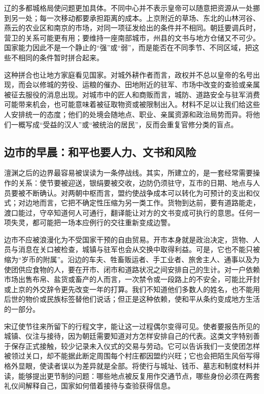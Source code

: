 辽的多都城格局使问题更加具体。不同中心并不表示皇帝可以随意把资源从一处挪到另一处；每一次移动都要承担距离的成本。上京附近的草场、东北的山林河谷、燕云的农业区和南京的市场，对同一项征发给出的条件并不相同。朝廷要调兵时，营卫的关系可能更有用；要维持一座南部城市，州县的文书与地方仓储又不可少。国家能力因此不是一个静止的“强”或“弱”，而是能否在不同季节、不同区域，把这些不相同的条件暂时拼合起来。

这种拼合也让地方家庭看见国家。对城外耕作者而言，政权并不总以皇帝的名号出现，而会以修城的劳役、运粮的催办、田地附近的驻军、市场中改变的查验或亲属被征去服役的消息出现。对城市中的匠人和商贩而言，城防、道路安全与驻军消费可能带来机会，也可能意味着被征取物资或被限制出入。材料不足以让我们给这些人安排统一的态度；他们的处境会随地点、职业、亲属资源和政治局势而异。将他们一概写成“受益的汉人”或“被统治的居民”，反而会重复官修分类的盲点。

\subsection{边市的早晨：和平也要人力、文书和风险}

澶渊之后的边界最容易被误读为一条停战线。其实，所建立的，是一套经常需要操作的关系：使节要被迎送，银绢要被交收，边防仍须驻守，互市的日期、地点与人员要被不断确认。对两朝中枢而言，盟约使战争成本可以转化为可预计的支出和仪式；对边地而言，它把不确定性压缩为另一类工作。货物到达前，要有道路能走，渡口能过，守卒知道何人可通行，翻译能让对方的文书变成可执行的意思。任何一项失灵，都可能把一场本应例行的交往重新变成边警。

边市不应被浪漫化为不受国家干预的自由贸易。开市本身就是政治决定，货物、人员与消息在关口被检查，城镇与驻军也会从交换中取得利益。可是，它也不能只被缩为“岁币的附属”。沿边的车夫、牲畜贩运者、手工业者、旅舍主人、通事以及为使团供应食物的人，要在开市、闭市和道路状况之间安排自己的生计。对一户依赖市场出售布帛、盐货或畜产的人而言，一次禁令或一段路上的不安全，可能比开封或上京的外交辞令更先改变一年的打算。我们不知道他们多数人的姓名，也不能用后世的物价或民族标签替他们说话；但正是这种依赖，使和平从条约变成地方生活的一部分。

宋辽使节往来所留下的行程文字，能让这一过程偶尔变得可见。使者要报告所见的城镇、仪注与接待，因为朝廷需要知道对方怎样安排自己的代表。这类文字特别善于保存正式接触，较少记录未入仪式的交易与劳动。它可以告诉我们一支使团怎样被领过关口，却不能据此断定周围每个村庄都因盟约兴旺；它也会把陌生风俗写得格外显眼，使读者误以为差异就是全部。将使行与城址、钱币、墓志和制度材料并读，能够提出更节制的问题：哪些地点被反复用作交通节点，哪些身份必须在两套礼仪间解释自己，国家如何借着接待与查验获得信息。

